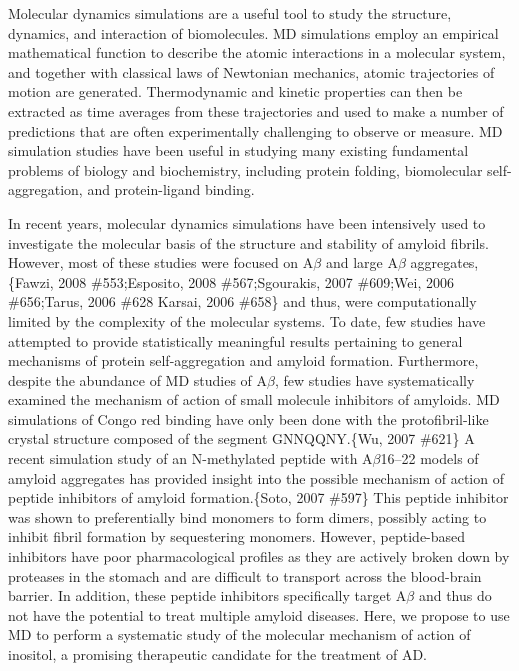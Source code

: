 Molecular dynamics simulations are a useful tool to study the structure, dynamics, and interaction of biomolecules. MD simulations employ an empirical mathematical function to describe the atomic interactions in a molecular system, and together with classical laws of Newtonian mechanics, atomic trajectories of motion are generated. Thermodynamic and kinetic properties can then be extracted as time averages from these trajectories and used to make a number of predictions that are often experimentally challenging to observe or measure. MD simulation studies have been useful in studying many existing fundamental problems of biology and biochemistry, including protein folding, biomolecular self-aggregation, and protein-ligand binding.

In recent years, molecular dynamics simulations have been intensively used to investigate the molecular basis of the structure and stability of amyloid fibrils. However, most of these studies were focused on A$\beta$ and large A$\beta$ aggregates,\{Fawzi, 2008 \#553;Esposito, 2008 \#567;Sgourakis, 2007 \#609;Wei, 2006 \#656;Tarus, 2006 \#628 Karsai,
2006 \#658\} and thus, were computationally limited by the complexity of the molecular systems. To date, few studies have attempted to provide statistically meaningful results pertaining to general mechanisms of protein self-aggregation and amyloid formation. Furthermore, despite the abundance of MD studies of A$\beta$, few studies have systematically examined the mechanism of action of small molecule inhibitors of amyloids. MD simulations of Congo red binding have only been done with the protofibril-like crystal structure composed of the segment GNNQQNY.\{Wu, 2007 \#621\} A recent simulation study of an N-methylated peptide with A$\beta$16--22 models of amyloid aggregates has provided insight into the possible mechanism of action of peptide inhibitors of amyloid formation.\{Soto, 2007 \#597\} This peptide inhibitor was shown to preferentially bind monomers to form dimers, possibly acting to inhibit fibril formation by sequestering monomers. However, peptide-based inhibitors have poor pharmacological profiles as they are actively broken down by proteases in the stomach and are difficult to transport across the blood-brain barrier. In addition, these peptide inhibitors specifically target A$\beta$ and thus do not have the potential to treat multiple amyloid diseases. Here, we propose to use MD to perform a systematic study of the molecular mechanism of action of inositol, a promising therapeutic candidate for the treatment of AD.



